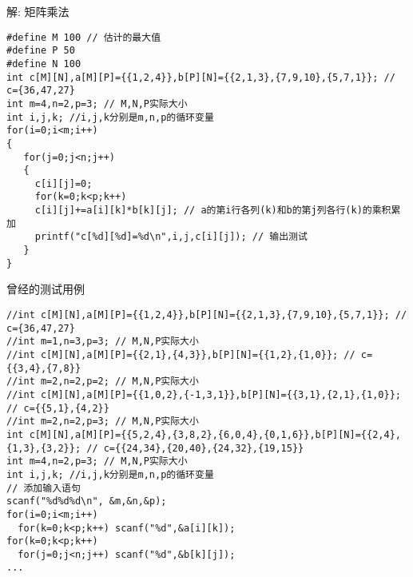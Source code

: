 \begin{frame}{解: 矩阵乘法}
\begin{lstlisting}
#define M 100 // 估计的最大值
#define P 50
#define N 100 
int c[M][N],a[M][P]={{1,2,4}},b[P][N]={{2,1,3},{7,9,10},{5,7,1}}; // c={36,47,27}
int m=4,n=2,p=3; // M,N,P实际大小
int i,j,k; //i,j,k分别是m,n,p的循环变量 
for(i=0;i<m;i++) 
{
   for(j=0;j<n;j++)
   {
     c[i][j]=0;
     for(k=0;k<p;k++) 
     c[i][j]+=a[i][k]*b[k][j]; // a的第i行各列(k)和b的第j列各行(k)的乘积累加 
     printf("c[%d][%d]=%d\n",i,j,c[i][j]); // 输出测试
   }
}
\end{lstlisting}
\end{frame}

\begin{frame}
\small{曾经的测试用例}
\begin{lstlisting}
//int c[M][N],a[M][P]={{1,2,4}},b[P][N]={{2,1,3},{7,9,10},{5,7,1}}; // c={36,47,27}
//int m=1,n=3,p=3; // M,N,P实际大小
//int c[M][N],a[M][P]={{2,1},{4,3}},b[P][N]={{1,2},{1,0}}; // c={{3,4},{7,8}}
//int m=2,n=2,p=2; // M,N,P实际大小
//int c[M][N],a[M][P]={{1,0,2},{-1,3,1}},b[P][N]={{3,1},{2,1},{1,0}}; // c={{5,1},{4,2}}
//int m=2,n=2,p=3; // M,N,P实际大小
int c[M][N],a[M][P]={{5,2,4},{3,8,2},{6,0,4},{0,1,6}},b[P][N]={{2,4},{1,3},{3,2}}; // c={{24,34},{20,40},{24,32},{19,15}}
int m=4,n=2,p=3; // M,N,P实际大小
int i,j,k; //i,j,k分别是m,n,p的循环变量  
// 添加输入语句
scanf("%d%d%d\n", &m,&n,&p);
for(i=0;i<m;i++)
  for(k=0;k<p;k++) scanf("%d",&a[i][k]);
for(k=0;k<p;k++)
  for(j=0;j<n;j++) scanf("%d",&b[k][j]);
...
\end{lstlisting}
\end{frame}                 






